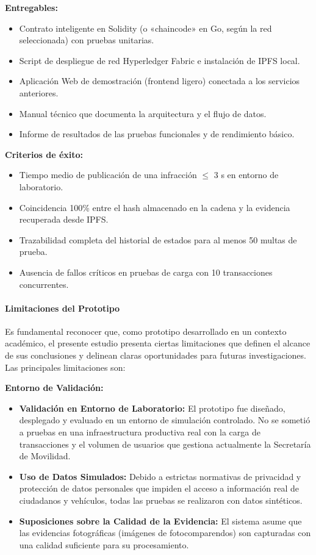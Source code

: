 \textbf{Entregables:}
\begin{itemize}
    \item Contrato inteligente en Solidity (o «chaincode» en Go, según la red seleccionada) con pruebas unitarias.
    \item Script de despliegue de red Hyperledger Fabric e instalación de IPFS local.
    \item Aplicación Web de demostración (frontend ligero) conectada a los servicios anteriores.
    \item Manual técnico que documenta la arquitectura y el flujo de datos.
    \item Informe de resultados de las pruebas funcionales y de rendimiento básico.
\end{itemize}

\textbf{Criterios de éxito:}
\begin{itemize}
    \item Tiempo medio de publicación de una infracción $\leq$ 3 s en entorno de laboratorio.
    \item Coincidencia 100\% entre el hash almacenado en la cadena y la evidencia recuperada desde IPFS.
    \item Trazabilidad completa del historial de estados para al menos 50 multas de prueba.
    \item Ausencia de fallos críticos en pruebas de carga con 10 transacciones concurrentes.
\end{itemize}

\paragraph{Limitaciones del Prototipo}
Es fundamental reconocer que, como prototipo desarrollado en un contexto académico, el presente estudio presenta ciertas limitaciones que definen el alcance de sus conclusiones y delinean claras oportunidades para futuras investigaciones. Las principales limitaciones son:

\textbf{Entorno de Validación:}
\begin{itemize}
    \item \textbf{Validación en Entorno de Laboratorio:} El prototipo fue diseñado, desplegado y evaluado en un entorno de simulación controlado. No se sometió a pruebas en una infraestructura productiva real con la carga de transacciones y el volumen de usuarios que gestiona actualmente la Secretaría de Movilidad.
    \item \textbf{Uso de Datos Simulados:} Debido a estrictas normativas de privacidad y protección de datos personales que impiden el acceso a información real de ciudadanos y vehículos, todas las pruebas se realizaron con datos sintéticos.
    \item \textbf{Suposiciones sobre la Calidad de la Evidencia:} El sistema asume que las evidencias fotográficas (imágenes de fotocomparendos) son capturadas con una calidad suficiente para su procesamiento.
\end{itemize}

